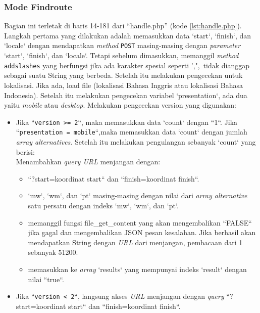 \subsubsection{Mode Findroute}
Bagian ini terletak di baris 14-181 dari ``handle.php'' (kode \ref{lst:handle.php}). Langkah pertama yang dilakukan adalah memasukkan data `start`, `finish`, dan `locale` dengan mendapatkan \textit{method} \verb!POST! masing-masing dengan \textit{parameter} `start`, `finish`, dan `locale`. Tetapi sebelum dimasukkan, memanggil \textit{method} \verb!addslashes! yang berfungsi jika ada karakter spesial seperti ',",\ tidak dianggap sebagai suatu String yang berbeda. Setelah itu melakukan pengecekan untuk lokalisasi. Jika ada, load file (lokalisasi Bahasa Inggris atau lokalisasi Bahasa Indonesia). Setelah itu melakukan pengecekan variabel `presentation`, ada dua yaitu  \textit{mobile} atau \textit{desktop}. Melakukan pengecekan version yang digunakan:
\begin{itemize}
	\item Jika ``\texttt{version >= 2}``, maka memasukkan data `count` dengan ``1``. Jika ``\texttt{presentation = mobile}``,maka memasukkan data `count` dengan jumlah \textit{array alternatives}. Setelah itu melakukan pengulangan sebanyak `count` yang berisi:\\
		Menambahkan \textit{query URL} menjangan dengan:
		\begin{itemize}
			\item 	``?start=koordinat start`` dan ``finish=koordinat finish``.
			\item `mw`, `wm`, dan `pt` masing-masing dengan nilai dari \textit{array alternative} satu persatu dengan indeks `mw`, `wm`, dan `pt`.
			\item memanggil fungsi file\_get\_content yang akan mengembalikan ``FALSE`` jika gagal dan mengembalikan JSON pesan kesalahan. Jika berhasil akan mendapatkan String dengan \textit{URL} dari menjangan, pembacaan dari 1 sebanyak 51200.
			\item memasukkan ke \textit{array} `results` yang mempunyai indeks `result` dengan nilai ``true``.
		\end{itemize}
	\item Jika ``\texttt{version < 2}``, langsung akses \textit{URL} menjangan dengan \textit{query} ``?start=koordinat start`` dan ``finish=koordinat finish``.
\end{itemize}

